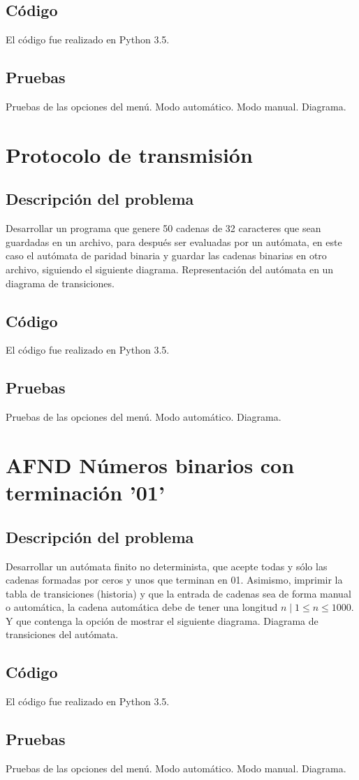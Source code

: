 \documentclass[12pt, titlepage]{article}
\begin{document}
	\subsection{Código}
	El código fue realizado en Python 3.5.
	\subsection{Pruebas}
	Pruebas de las opciones del menú.
	{\large Modo automático.}
	{\large Modo manual.}
	{\large Diagrama.}
	
	\section{Protocolo de transmisión}
	\subsection{Descripción del problema}
	Desarrollar un programa que genere 50 cadenas de 32 caracteres que sean guardadas en un archivo, para después ser evaluadas por un autómata, en este caso el autómata de paridad binaria y guardar las cadenas binarias en otro archivo, siguiendo el siguiente diagrama.
	Representación del autómata en un diagrama de transiciones. \cite{WEB}
	\subsection{Código}
	El código fue realizado en Python 3.5.
	\subsection{Pruebas}
	Pruebas de las opciones del menú.
	{\large Modo automático.}
	{\large Diagrama.}
	
	\section{AFND Números binarios con terminación '01'}
	\subsection{Descripción del problema}
	Desarrollar un autómata finito no determinista, que acepte todas y sólo las cadenas formadas por ceros y unos que terminan en 01. Asimismo, imprimir la tabla de transiciones (historia) y que la entrada de cadenas sea de forma manual o automática, la cadena automática debe de tener una longitud $n \mid 1  \leq n \leq 1000$. Y que contenga la opción de mostrar el siguiente diagrama.
	Diagrama de transiciones del autómata. \cite{LIBRO}
	\subsection{Código}
	El código fue realizado en Python 3.5.
	\subsection{Pruebas}
	Pruebas de las opciones del menú.
	{\large Modo automático.}
	{\large Modo manual.}
	{\large Diagrama.}
	
	 
	
\end{document}
